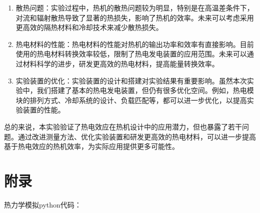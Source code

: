 \documentclass[dvipsnames, svgnames,a4paper,11pt]{article}
\begin{document}
\begin{itemize}
\begin{enumerate}
                \item 散热问题：实验过程中，热机的散热问题较为明显，特别是在高温差条件下，对流和辐射散热导致了显著的热损失，影响了热机的效率。未来可以考虑采用更高效的隔热材料和冷却技术来减少散热损失。
                
                \item 热电材料的性能：热电材料的性能对热机的输出功率和效率有直接影响。目前使用的热电材料转换效率较低，限制了热电发电装置的应用范围。未来可以通过材料科学的进步，研发更高效的热电材料，提高能量转换效率。
                
                \item 实验装置的优化：实验装置的设计和搭建对实验结果有重要影响。虽然本次实验中，我们搭建了基本的热电发电装置，但仍有很多优化空间。例如，热电模块的排列方式、冷却系统的设计、负载匹配等，都可以进一步优化，以提高实验装置的性能。
            \end{enumerate}
    \end{itemize}


    总的来说，本实验验证了热电效应在热机设计中的应用潜力，但也暴露了若干问题。通过改进测量方法、优化实验装置和研发更高效的热电材料，可以进一步提高基于热电效应的热机效率，为实际应用提供更多可能性。






\clearpage
\section{附录}




    





    热力学模拟python代码：
\end{document}
